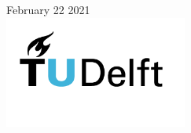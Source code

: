 \begin{titlepage}


{\large February 22 2021}\\[2cm] %


\includegraphics[width=6cm]{Figures/TUDelft_logo.png} %
 

\vfill %

\end{titlepage}

\tableofcontents

\newpage





\newpage

\newpage


\newpage
%



% 
% 

